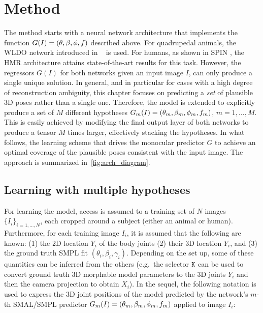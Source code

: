 \section{Method}\label{s:method}


The method starts with a neural network architecture that implements the function $G(I) = (\theta, \beta, \phi, f)$ described above.
For quadrupedal animals, the WLDO network introduced in ~ is used. For humans, as shown in SPIN \cite{kolotouros19learning}, the HMR \cite{kanazawa18end-to-end} architecture attains state-of-the-art results for this task.
However, the regressors $G(I)$ for both networks given an input image $I$, can only produce a single unique solution.
In general, and in particular for cases with a high degree of reconstruction ambiguity, this chapter focuses on predicting a \emph{set} of plausible 3D poses rather than a single one.
%
Therefore, the model is extended to explicitly produce a set of $M$ different hypotheses $G_m (I) = (\theta_m, \beta_m, \phi_m, f_m)$, $m=1,\dots,M$.
This is easily achieved by modifying the final output layer of both networks to produce a tensor $M$ times larger, effectively stacking the hypotheses.
In what follows, the learning scheme that drives the monocular predictor $G$ to achieve an optimal coverage of the plausible poses consistent with the input image. The approach is summarized in~\cref{fig:arch_diagram}. 

\subsection{Learning with multiple hypotheses}

For learning the model, access is assumed to a training set of $N$ images $\{I_i\}_{i =1,\dots,N}$, each cropped around a subject (either an animal or human).
Furthermore, for each training image $I_i$, it is assumed that the following are known: (1) the 2D location $Y_i$ of the body joints (2) their 3D location $Y_i$, and (3) the ground truth SMPL fit $(\theta_i, \beta_i, \gamma_i)$.
Depending on the set up, some of these quantities can be inferred from the others (e.g.~the selector $\mathtt{K}$ can be used to convert ground truth 3D morphable model parameters to the 3D joints $Y_i$ and then the camera projection to obtain $X_i$).
In the sequel, the following notation is used to express the 3D joint positions of the model predicted by the network's $m$-th SMAL/SMPL predictor $G_m (I) = (\theta_m, \beta_m, \phi_m, f_m)$ applied to image $I_{i}$:

